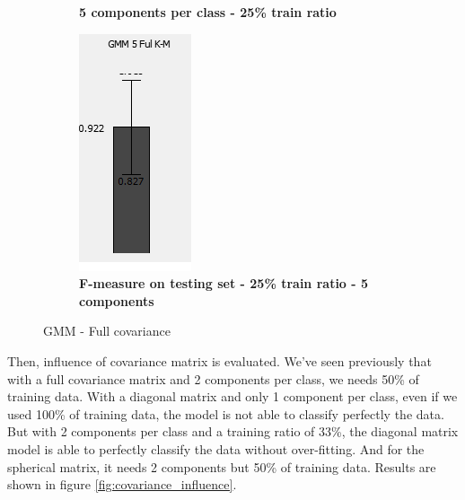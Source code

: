 \begin{figure} [ht]
\begin{subfigure}[h]{0.40\textwidth}
	\caption{\bf 5 components per class - 25\% train ratio}
    \end{subfigure}
    \hspace{20mm}
    \begin{subfigure}[h]{0.40\textwidth}
    \centering
    \includegraphics[height=0.12\textheight]{./classification/overfitting_case_gmm_5_25_.png}
	\caption{\bf F-measure on testing set - 25\% train ratio - 5 components}
    \label{overfitting_case_5components}
    \end{subfigure}

\caption{GMM - Full covariance}
\label{fig:number_per_component}
\end{figure}

Then, influence of covariance matrix is evaluated. We've seen previously that with a full covariance matrix and 2 components per class, we needs 50\% of training data. With a diagonal matrix and only 1 component per class, even if we used 100\% of training data, the model is not able to classify perfectly the data. But with 2 components per class and a training ratio of 33\%, the diagonal matrix model is able to perfectly classify the data without over-fitting. And for the spherical matrix, it needs 2 components but 50\% of training data. Results are shown in figure \ref{fig:covariance_influence}.


